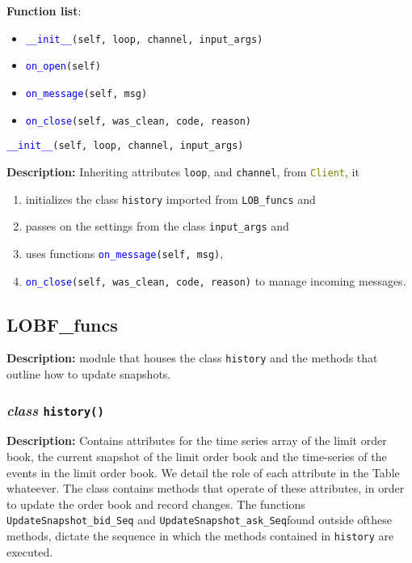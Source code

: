 \documentclass[refman]{article}
\begin{document}
	\textbf{Function list}:
	\begin{itemize}
		\item \textcolor{blue}{\texttt{\_\_init\_\_}}\texttt{(self, loop, channel, input\_args)}
		\item
		\textcolor{blue}{\texttt{on\_open}}\texttt{(self)}
		\item \textcolor{blue}{\texttt{on\_message}}\texttt{(self, msg)}
		\item \textcolor{blue}{\texttt{on\_close}}\texttt{(self, was\_clean, code, reason)}
	\end{itemize}

	\textcolor{blue}{\texttt{\_\_init\_\_}}\texttt{(self, loop, channel, input\_args)}
	\medskip
	
	\noindent \textbf{Description:} Inheriting attributes \texttt{loop}, and \texttt{channel}, from \textcolor{olive}{\texttt{Client}}, it
	\begin{enumerate} 
		\item initializes the class \texttt{history} imported from \texttt{LOB\_funcs} and
		\item passes on the settings from the class \texttt{input\_args} and \item uses functions \textcolor{blue}{\texttt{on\_message}}\texttt{(self, msg)},
		\item \textcolor{blue}{\texttt{on\_close}}\texttt{(self, was\_clean, code, reason)} to manage incoming messages.
	\end{enumerate} 


	

	
	
	
	
	
	 
 

\subsection{LOBF\_funcs}
\hfill \break
\textbf{Description:} module that houses the class \texttt{history} and the methods that outline how to update snapshots.

\subsubsection{\textit{class} \texttt{history()}}\hfill \break
\textbf{Description:} Contains attributes for the time series array of the limit order book, the current snapshot of the limit order book and the time-series of the events in the limit order book. We detail the role of each attribute in the Table whateever. The class contains methods that operate of these attributes, in order to update the order book and record changes. The functions \texttt{UpdateSnapshot\_bid\_Seq} and \texttt{UpdateSnapshot\_ask\_Seq}found outside ofthese methods, dictate the sequence in which the methods contained in \texttt{history} are executed.
\end{document}
